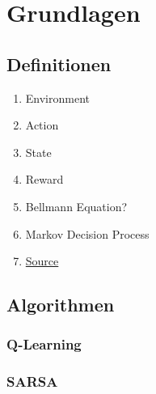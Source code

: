 \section{Grundlagen}


\subsection{Definitionen}

\begin{enumerate}
    \item Environment
    \item Action
    \item State
    \item Reward
    \item Bellmann Equation?
    \item Markov Decision Process
    \item \href{https://blog.floydhub.com/an-introduction-to-q-learning-reinforcement-learning/}{Source} 
\end{enumerate}

\subsection{Algorithmen}

\subsubsection{Q-Learning}

\subsubsection{SARSA}